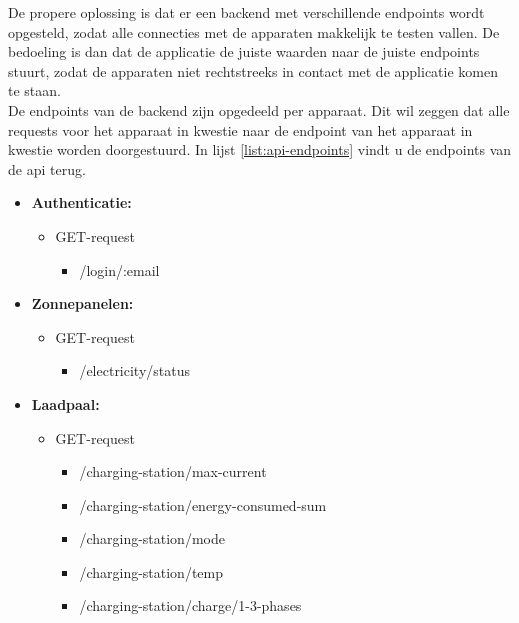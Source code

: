 De propere oplossing is dat er een backend met verschillende endpoints wordt opgesteld, zodat alle connecties met de apparaten makkelijk te testen vallen. De bedoeling is dan dat de applicatie de juiste waarden naar de juiste endpoints stuurt, zodat de apparaten niet rechtstreeks in contact met de applicatie komen te staan.\\

De endpoints van de backend zijn opgedeeld per apparaat. Dit wil zeggen dat alle requests voor het apparaat in kwestie naar de endpoint van het apparaat in kwestie worden doorgestuurd. In lijst \ref{list:api-endpoints} vindt u de endpoints van de api terug.

\begin{itemize}
    \item \textbf{Authenticatie:} \label{list:api-endpoints}
          \begin{itemize}
              \item GET-request
                    \begin{itemize}
                        \item /login/:email
                    \end{itemize}
          \end{itemize}
    \item \textbf{Zonnepanelen:}
          \begin{itemize}
              \item GET-request
                    \begin{itemize}
                        \item /electricity/status
                    \end{itemize}
          \end{itemize}
    \item \textbf{Laadpaal:}
          \begin{itemize}
              \item GET-request
                    \begin{itemize}
                        \item /charging-station/max-current
                        \item /charging-station/energy-consumed-sum
                        \item /charging-station/mode
                        \item /charging-station/temp
                        \item /charging-station/charge/1-3-phases
                    \end{itemize}

\end{itemize}
\end{itemize}
